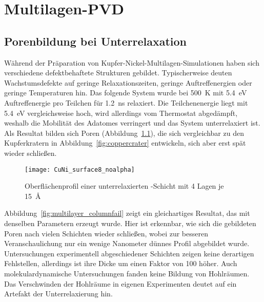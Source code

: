 \chapter{Multilagen-PVD}
\label{appendix_multilayer}

\section{Porenbildung bei Unterrelaxation}

Während der Präparation von Kupfer-Nickel-Multilagen-Simulationen haben sich verschiedene defektbehaftete Strukturen gebildet.
Typischerweise deuten Wachstumsdefekte auf geringe Relaxationszeiten, geringe Auftreffenergien oder geringe Temperaturen hin.
Das folgende System wurde bei \SI{500}{\kelvin} mit \SI{5.4}{\electronvolt} Auftreffenergie pro Teilchen für \SI{1.2}{\nano\second} relaxiert.
Die Teilchenenergie liegt mit \SI{5.4}{\electronvolt} vergleichsweise hoch\cite{zhou_atomistic_1998}, wird allerdings vom Thermostat abgedämpft, weshalb die Mobilität des Adatomes verringert und das System unterrelaxiert ist.
Als Resultat bilden sich Poren (Abbildung~\ref{fig:multilayer_surfacefail}), die sich vergleichbar zu den Kupferkratern in Abbildung~\ref{fig:coppercrater} entwickeln, sich aber erst spät wieder schließen.

\begin{figure}[!h]
  \centering
  \texttt{[image: CuNi\_surface8\_noalpha]}
  \caption[Oberflächenprofil einer unterrelaxierten -Multilage]{Oberflächenprofil einer unterrelaxierten -Schicht mit 4 Lagen je \SI{15}{\angstrom}}
  \label{fig:multilayer_surfacefail}
\end{figure}

Abbildung~\ref{fig:multilayer_columnfail} zeigt ein gleichartiges Resultat, das mit denselben Parametern erzeugt wurde.
Hier ist erkennbar, wie sich die gebildeten Poren nach vielen Schichten wieder schließen, wobei zur besseren Veranschaulichung nur ein wenige Nanometer dünnes Profil abgebildet wurde.
Untersuchungen experimentell abgeschiedener Schichten zeigen keine derartigen Fehlstellen\cite{yang_pulsed_1995}, allerdings ist ihre Dicke um einen Faktor von \num{100} höher.
Auch molekulardynamische Untersuchungen\cite{zhou_atomic_2001} fanden keine Bildung von Hohlräumen.
Das Verschwinden der Hohlräume in eigenen Experimenten deutet auf ein Artefakt der Unterrelaxierung hin.

